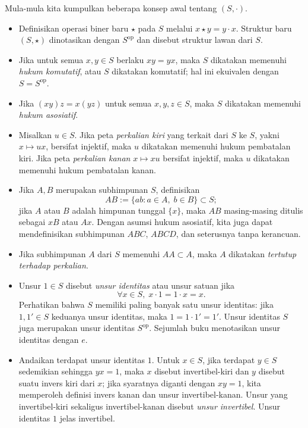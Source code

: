 Mula-mula kita kumpulkan beberapa konsep awal tentang $(S, \cdot)$.
\begin{itemize}
	\item Definisikan operasi biner baru $\star$ pada $S$ melalui $x \star y = y \cdot x$. Struktur baru $(S, \star)$ dinotasikan dengan $S^\text{op}$ dan disebut struktur lawan dari $S$.
	\item Jika untuk semua $x,y \in S$ berlaku $xy=yx$, maka $S$ dikatakan memenuhi \emph{hukum komutatif}, atau $S$ dikatakan komutatif; hal ini ekuivalen dengan $S=S^\text{op}$.
	\item Jika $(xy)z=x(yz)$ untuk semua $x,y,z \in S$, maka $S$ dikatakan memenuhi \emph{hukum asosiatif}.
	\item Misalkan $u \in S$. Jika peta \emph{perkalian kiri} yang terkait dari $S$ ke $S$, yakni $x \mapsto ux$, bersifat injektif, maka $u$ dikatakan memenuhi hukum pembatalan kiri. Jika peta \emph{perkalian kanan} $x \mapsto xu$ bersifat injektif, maka $u$ dikatakan memenuhi hukum pembatalan kanan.
	\item Jika $A,B$ merupakan subhimpunan $S$, definisikan
		\[ A B := \{ab : a \in A, \; b \in B \} \subset S; \]
		jika $A$ atau $B$ adalah himpunan tunggal $\{x\}$, maka $AB$ masing-masing ditulis sebagai $xB$ atau $Ax$. Dengan asumsi hukum asosiatif, kita juga dapat mendefinisikan subhimpunan $ABC$, $ABCD$, dan seterusnya tanpa kerancuan.
	\item Jika subhimpunan $A$ dari $S$ memenuhi $AA \subset A$, maka $A$ dikatakan \emph{tertutup terhadap perkalian}.
	\item Unsur $1 \in S$ disebut \emph{unsur identitas} atau unsur satuan jika 
		\[ \forall x \in S, \; x \cdot 1 = 1 \cdot x = x. \]
		Perhatikan bahwa $S$ memiliki paling banyak satu unsur identitas: jika $1,1' \in S$ keduanya unsur identitas, maka $1=1\cdot 1'=1'$. Unsur identitas $S$ juga merupakan unsur identitas $S^\text{op}$. Sejumlah buku menotasikan unsur identitas dengan $e$.
	\item Andaikan terdapat unsur identitas $1$. Untuk $x \in S$, jika terdapat $y \in S$ sedemikian sehingga $yx=1$, maka $x$ disebut invertibel-kiri dan $y$ disebut suatu invers kiri dari $x$; jika syaratnya diganti dengan $xy=1$, kita memperoleh definisi invers kanan dan unsur invertibel-kanan. Unsur yang invertibel-kiri sekaligus invertibel-kanan disebut \emph{unsur invertibel}. Unsur identitas $1$ jelas invertibel.
\end{itemize}

